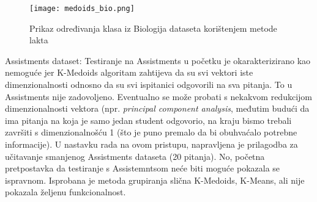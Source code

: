 \begin{figure}[!htb]
\centering
\texttt{[image: medoids\_bio.png]}
\caption{Prikaz određivanja klasa iz Biologija dataseta korištenjem metode lakta}
\label{fig:medoids_bio}
\end{figure}

Assistments dataset:\newline
Testiranje na Assistments u početku je okarakterizirano kao nemoguće jer K-Medoids algoritam zahtijeva da su svi vektori iste dimenzionalnosti odnosno da su svi ispitanici odgovorili na sva pitanja. To u Assistments nije zadovoljeno. Eventualno se može probati s nekakvom redukcijom dimenzionalnosti vektora (npr. \textit{principal component analysis}, međutim budući da ima pitanja na koja je samo jedan student odgovorio, na kraju bismo trebali završiti s dimenzionalnošću 1 (što je puno premalo da bi obuhvaćalo potrebne informacije).\newline
U nastavku rada na ovom pristupu, napravljena je prilagodba za učitavanje smanjenog Assistments dataseta (20 pitanja). No, početna pretpostavka da testiranje s Assistemntsom neće biti moguće pokazala se ispravnom. Isprobana je metoda grupiranja slična K-Medoids, K-Means, ali nije pokazala željenu funkcionalnost.

